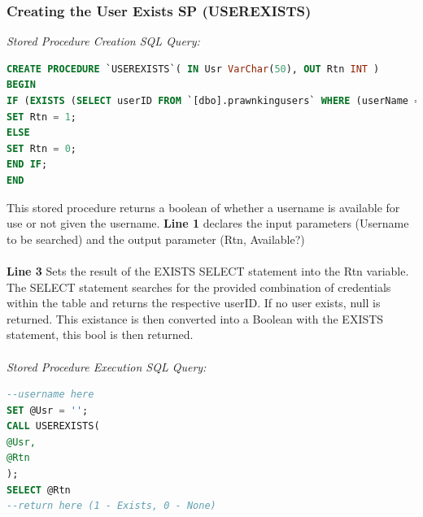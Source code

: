 \documentclass[a4paper,11pt]{proc}
\begin{document}
\subsubsection{Creating the User Exists SP (USEREXISTS)}
\textit{Stored Procedure Creation SQL Query:}
\begin{lstlisting}[language=SQL,
deletekeywords={IDENTITY,INT},
morekeywords={clustered,OUT, BEGIN, PROCEDURE},    
framesep=10pt,
framextopmargin=10pt]
CREATE PROCEDURE `USEREXISTS`( IN Usr VarChar(50), OUT Rtn INT )
BEGIN
IF (EXISTS (SELECT userID FROM `[dbo].prawnkingusers` WHERE (userName = Usr))) THEN
SET Rtn = 1;
ELSE
SET Rtn = 0;
END IF;
END
\end{lstlisting}
This stored procedure returns a boolean of whether a username is available for use or not given the username. \textbf{Line 1} declares the input parameters (Username to be searched) and the output parameter (Rtn, Available?)\\
\\\textbf{Line 3} Sets the result of the EXISTS SELECT statement into the Rtn variable. The SELECT statement searches for the provided combination of credentials within the table and returns the respective userID. If no user exists, null is returned. This existance is then converted into a Boolean with the EXISTS statement, this bool is then returned.\\
\\\textit{Stored Procedure Execution SQL Query:}
\begin{lstlisting}[language=SQL,
deletekeywords={IDENTITY,INT},
morekeywords={clustered,OUT, BEGIN, PROCEDURE,CALL},    
framesep=10pt,
framextopmargin=10pt]
--username here
SET @Usr = '';
CALL USEREXISTS(
@Usr,
@Rtn
);
SELECT @Rtn
--return here (1 - Exists, 0 - None)
\end{lstlisting}
\end{document}
